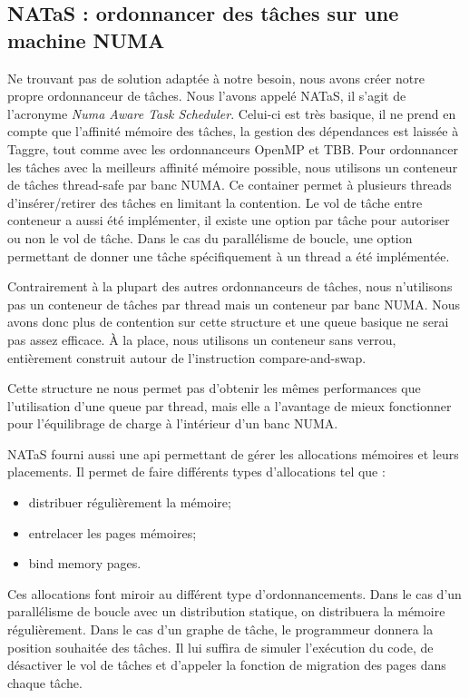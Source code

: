 \subsection{NATaS : ordonnancer des tâches sur une machine NUMA}
Ne trouvant pas de solution adaptée à notre besoin, nous avons créer notre propre ordonnanceur de tâches.
%
Nous l'avons appelé NATaS, il s'agit de l'acronyme {\em Numa Aware Task Scheduler}.
%
Celui-ci est très basique, il ne prend en compte que l'affinité mémoire des tâches, la gestion des dépendances est laissée à Taggre, tout comme avec les ordonnanceurs OpenMP et TBB.
%
Pour ordonnancer les tâches avec la meilleurs affinité mémoire possible, nous utilisons un conteneur de tâches thread-safe par banc NUMA.
%
Ce container permet à plusieurs threads d'insérer/retirer des tâches en limitant la contention.
%
Le vol de tâche entre conteneur a aussi été implémenter, il existe une option par tâche pour autoriser ou non le vol de tâche.
%
Dans le cas du parallélisme de boucle, une option permettant de donner une tâche spécifiquement à un thread a été implémentée.


Contrairement à la plupart des autres ordonnanceurs de tâches, nous n'utilisons pas un conteneur de tâches par thread mais un conteneur par banc NUMA.
%
Nous avons donc plus de contention sur cette structure et une queue basique ne serai pas assez efficace.
%
\`A la place, nous utilisons un conteneur sans verrou, entièrement construit autour de l'instruction compare-and-swap.
%

%
Cette structure ne nous permet pas d'obtenir les mêmes performances que l'utilisation d'une queue par thread, mais elle a l'avantage de mieux fonctionner pour l'équilibrage de charge à l'intérieur d'un banc NUMA.



NATaS fourni aussi une api permettant de gérer les allocations mémoires et leurs placements.
%
Il permet de faire différents types d'allocations tel que :
\begin{itemize}
  \item distribuer régulièrement la mémoire;
  \item entrelacer les pages mémoires;
  \item bind memory pages.
\end{itemize}
%
Ces allocations font miroir au différent type d'ordonnancements.
%
Dans le cas d'un parallélisme de boucle avec un distribution statique, on distribuera la mémoire régulièrement.
%
Dans le cas d'un graphe de tâche, le programmeur donnera la position souhaitée des tâches.
%
Il lui suffira de simuler l'exécution du code, de désactiver le vol de tâches et d'appeler la fonction de migration des pages dans chaque tâche.



